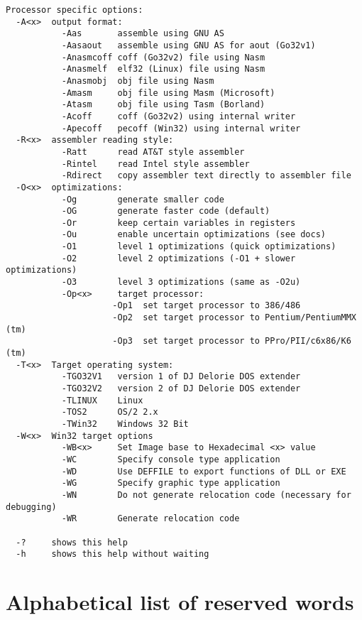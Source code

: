 \documentclass{report}
\begin{document}
\begin{verbatim}
Processor specific options:
  -A<x>  output format:
           -Aas       assemble using GNU AS
           -Aasaout   assemble using GNU AS for aout (Go32v1)
           -Anasmcoff coff (Go32v2) file using Nasm
           -Anasmelf  elf32 (Linux) file using Nasm
           -Anasmobj  obj file using Nasm
           -Amasm     obj file using Masm (Microsoft)
           -Atasm     obj file using Tasm (Borland)
           -Acoff     coff (Go32v2) using internal writer
           -Apecoff   pecoff (Win32) using internal writer
  -R<x>  assembler reading style:
           -Ratt      read AT&T style assembler
           -Rintel    read Intel style assembler
           -Rdirect   copy assembler text directly to assembler file
  -O<x>  optimizations:
           -Og        generate smaller code
           -OG        generate faster code (default)
           -Or        keep certain variables in registers
           -Ou        enable uncertain optimizations (see docs)
           -O1        level 1 optimizations (quick optimizations)
           -O2        level 2 optimizations (-O1 + slower optimizations)
           -O3        level 3 optimizations (same as -O2u)
           -Op<x>     target processor:
                     -Op1  set target processor to 386/486
                     -Op2  set target processor to Pentium/PentiumMMX (tm)
                     -Op3  set target processor to PPro/PII/c6x86/K6 (tm)
  -T<x>  Target operating system:
           -TGO32V1   version 1 of DJ Delorie DOS extender
           -TGO32V2   version 2 of DJ Delorie DOS extender
           -TLINUX    Linux
           -TOS2      OS/2 2.x
           -TWin32    Windows 32 Bit
  -W<x>  Win32 target options
           -WB<x>     Set Image base to Hexadecimal <x> value
           -WC        Specify console type application
           -WD        Use DEFFILE to export functions of DLL or EXE
           -WG        Specify graphic type application
           -WN        Do not generate relocation code (necessary for debugging)
           -WR        Generate relocation code

  -?     shows this help
  -h     shows this help without waiting
\end{verbatim}



\chapter{Alphabetical list of reserved words}
\label{ch:reserved}
\begin{multicols}{3}

\end{multicols}
\end{document}
